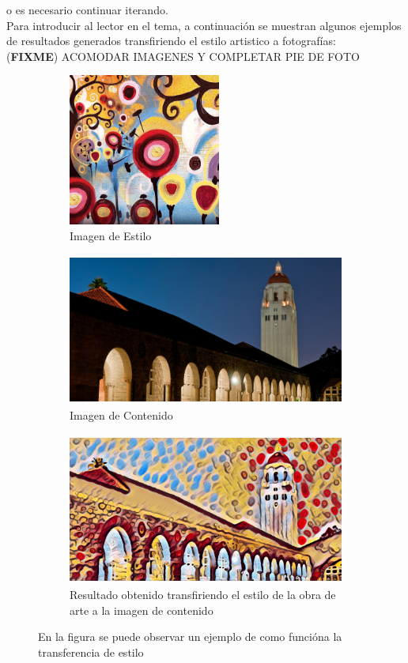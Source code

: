 \documentclass[a4paper,11pt,spanish]{book}
\newcommand*{\FIXME}[1]{{(\textbf{FIXME}) {#1}}}
\begin{document}
    o es necesario continuar iterando. \\
    Para introducir al lector en el tema, a continuación se muestran algunos ejemplos de resultados generados transfiriendo el estilo artistico a fotografías:\\
    \FIXME{ACOMODAR IMAGENES Y COMPLETAR PIE DE FOTO}
    \begin{figure}[h]

      \begin{subfigure}{0.7\textwidth}
	\includegraphics[width=0.9\linewidth, height=5cm]{./img/jhonson_style_candy.jpg}
	\caption{Imagen de Estilo}
	\label{fig:candy}
      \end{subfigure}

      \begin{subfigure}{0.7\textwidth}
	\includegraphics[width=0.9\linewidth, height=5cm]{./img/jhonson_content_tower.jpg}
	\caption{Imagen de Contenido}
	\label{fig:tower}
      \end{subfigure}

      \begin{subfigure}{0.7\textwidth}
	\includegraphics[width=0.9\linewidth, height=5cm]{./img/jhonson_result_tower_candy.jpg}
	\caption{Resultado obtenido transfiriendo el estilo de la obra de arte a la imagen de contenido}
	\label{fig:candy_tower}
      \end{subfigure}
    \caption{En la figura se puede observar un ejemplo de como funcióna la transferencia de estilo}
    \label{fig:style_transfer_candy_tower}
    \end{figure}
\end{document}
